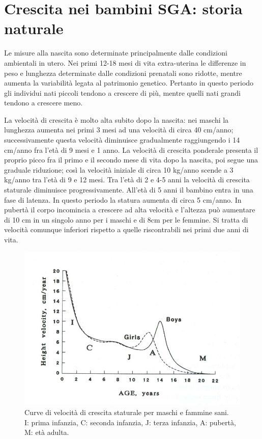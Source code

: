 \section{Crescita nei bambini SGA: storia naturale}

Le misure alla nascita sono determinate principalmente dalle condizioni ambientali in utero. Nei primi 12-18 mesi di vita extra-uterina le differenze in peso e lunghezza determinate dalle condizioni prenatali sono ridotte, mentre aumenta la variabilità legata al patrimonio genetico. Pertanto in questo periodo gli individui nati piccoli tendono a crescere di più, mentre quelli nati grandi tendono a crescere meno. 

La velocità di crescita è molto alta subito dopo la nascita: nei maschi la lunghezza aumenta nei primi 3 mesi ad una velocità di circa 40 cm/anno; successivamente questa velocità diminuisce gradualmente raggiungendo i 14 cm/anno fra l'età di 9 mesi e 1 anno. La velocità di crescita ponderale presenta il proprio picco fra il primo e il secondo mese di vita dopo la nascita, poi segue una graduale riduzione; così la velocità iniziale di circa 10 kg/anno scende a 3 kg/anno tra l'età di 9 e 12 mesi. Tra l'età di 2 e 4-5 anni la velocità di crescita staturale diminuisce progressivamente\cite{tanner1994growth}.
 All'età di 5 anni il bambino entra in una fase di latenza. In questo periodo la statura aumenta di circa 5 cm/anno. In pubertà il corpo incomincia a crescere ad alta velocità e l'altezza può aumentare di 10 cm in un singolo anno per i maschi e di 8cm per le femmine. Si tratta di velocità comunque inferiori rispetto a quelle riscontrabili nei primi due anni di vita.
 
\begin{figure}[!h]
  \begin{center}
      \includegraphics{grafici/grafico_velocita} %
  \end{center}
  \caption{Curve di velocità di crescita staturale per maschi e fammine sani.\\I: prima infanzia, C: seconda infanzia, J: terza infanzia, A: pubertà, M: età adulta. \cite{bogin1996evolution}}
  \label{fig:GraficoVelocita}
\end{figure}
 
